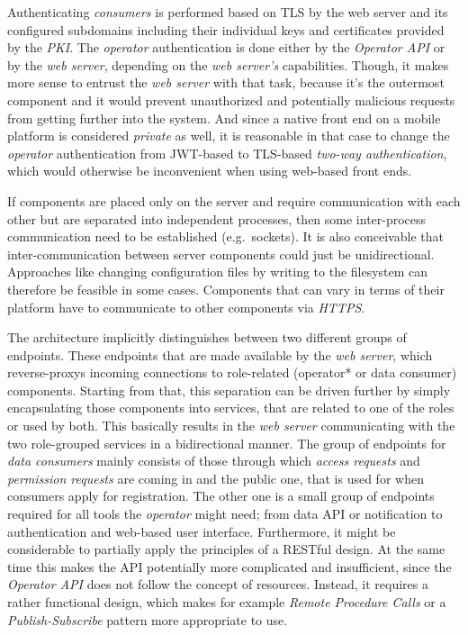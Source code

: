 \documentclass[12pt,english,a4paper,titlepage,cleardoublepage=empty,dottedtoc]{report}
\begin{document}
Authenticating \emph{consumers} is performed based on TLS by the web
server and its configured subdomains including their individual keys and
certificates provided by the \emph{PKI}. The \emph{operator}
authentication is done either by the \emph{Operator API} or by the
\emph{web server}, depending on the \emph{web server's} capabilities.
Though, it makes more sense to entrust the \emph{web server} with that
task, because it's the outermost component and it would prevent
unauthorized and potentially malicious requests from getting further
into the system. And since a native front end on a mobile platform is
considered \emph{private} as well, it is reasonable in that case to
change the \emph{operator} authentication from JWT-based to TLS-based
\emph{two-way authentication}, which would otherwise be inconvenient
when using web-based front ends.

If components are placed only on the server and require communication
with each other but are separated into independent processes, then some
inter-process communication need to be established (e.g.~sockets). It is
also conceivable that inter-communication between server components
could just be unidirectional. Approaches like changing configuration
files by writing to the filesystem can therefore be feasible in some
cases. Components that can vary in terms of their platform have to
communicate to other components via \emph{HTTPS}.

The architecture implicitly distinguishes between two different groups
of endpoints. These endpoints that are made available by the \emph{web
server}, which reverse-proxys incoming connections to role-related
(operator* or data consumer) components. Starting from that, this
separation can be driven further by simply encapsulating those
components into services, that are related to one of the roles or used
by both. This basically results in the \emph{web server} communicating
with the two role-grouped services in a bidirectional manner. The group
of endpoints for \emph{data consumers} mainly consists of those through
which \emph{access requests} and \emph{permission requests} are coming
in and the public one, that is used for when consumers apply for
registration. The other one is a small group of endpoints required for
all tools the \emph{operator} might need; from data API or notification
to authentication and web-based user interface. Furthermore, it might be
considerable to partially apply the principles of a RESTful design. At
the same time this makes the API potentially more complicated and
insufficient, since the \emph{Operator API} does not follow the concept
of resources. Instead, it requires a rather functional design, which
makes for example \emph{Remote Procedure Calls} or a
\emph{Publish-Subscribe} pattern more appropriate to use.
\end{document}
